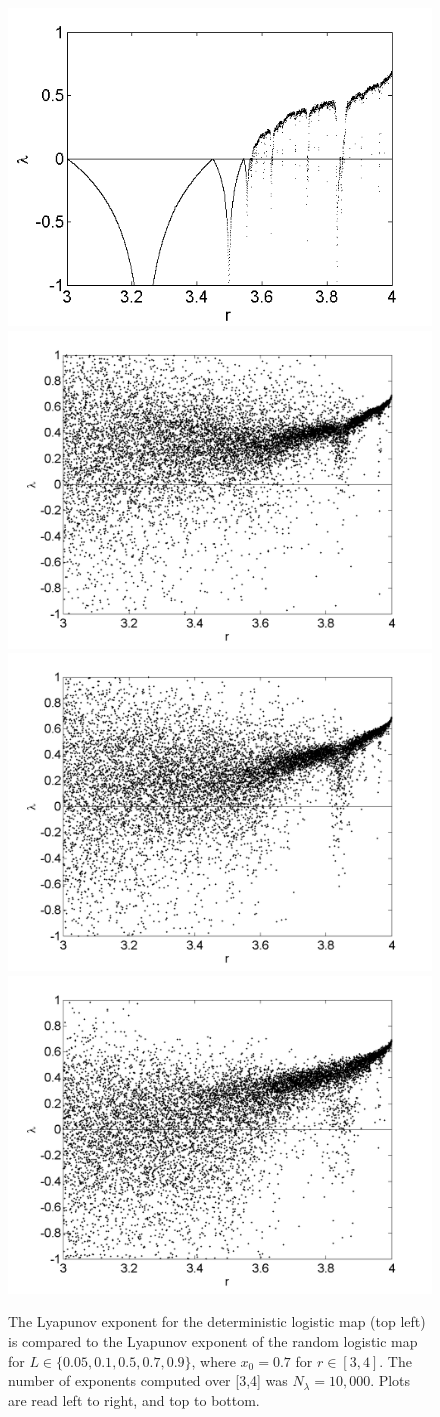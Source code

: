 \begin{figure}[!h]
\caption[Lyapunov exponent in the random logistic map compared to the
deterministic map]{The Lyapunov exponent for the deterministic
  logistic map (top left) is compared
  to the Lyapunov exponent of the random logistic map for $L \in \{0.05,0.1,0.5,0.7,0.9\}$, where $x_0=0.7$ for $r \in [3,4]$. The number of exponents computed over
  [3,4] was $N_\lambda=10,000$. Plots are read left to right, and top
  to bottom. }\label{fig:rloglyap2}
\centering
\includegraphics[width=.5\textwidth]{figs/det_log_lyap.png}\hfill
\includegraphics[width=.5\textwidth]{figs/rlog_lyap_L_005.png}\\
\includegraphics[width=.5\textwidth]{figs/rlog_lyap_L_01.png}\hfill
\includegraphics[width=.5\textwidth]{figs/rlog_lyap_L_05.png}\\

\end{figure}
